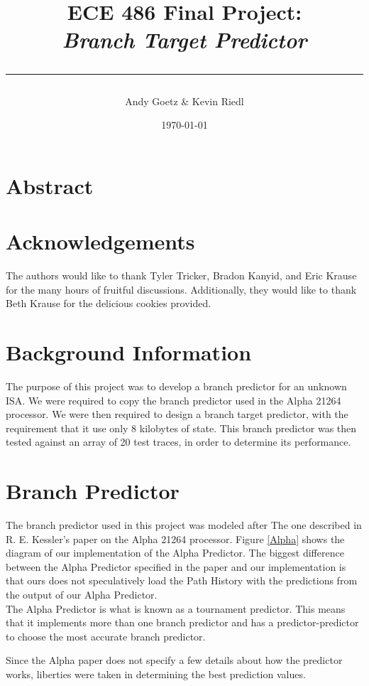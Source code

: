 \documentclass[twocolumn]{article}
\author{\LARGE Andy Goetz \& Kevin Riedl}
\date{\today}
\title{\Huge \textbf{ECE 486 Final Project:} \\ \it{Branch Target Predictor} \\ \rule{\linewidth}{0.5mm}}
\begin{document}
\maketitle
\section{Abstract}
\section{Acknowledgements}

The authors would like to thank Tyler Tricker, Bradon Kanyid, and Eric
Krause for the many hours of fruitful discussions. Additionally, they
would like to thank Beth Krause for the delicious cookies provided.

\section{Background Information}
The purpose of this project was to develop a branch predictor for an
unknown ISA. We were required to copy the branch predictor used in the
Alpha 21264 processor. We were then required to design a branch target
predictor, with the requirement that it use only 8 kilobytes of
state. This branch predictor was then tested against an array of 20
test traces, in order to determine its performance. 


\section{Branch Predictor}
The branch predictor used in this project was modeled after
The one described in R. E. Kessler's paper on the Alpha 
21264 processor. Figure \ref{Alpha} shows the diagram of
our implementation of the Alpha Predictor. The biggest
difference between the Alpha Predictor specified in the
paper and our implementation is that ours does not
speculatively load the Path History with the predictions
from the output of our Alpha Predictor. \\
The Alpha Predictor is what is known as a tournament predictor.
This means that it implements more than one branch predictor 
and has a predictor-predictor to choose the most accurate branch 
predictor.

Since the Alpha paper does not specify a few details about how the predictor
works, liberties were taken in determining the best prediction values. 
\end{document}
